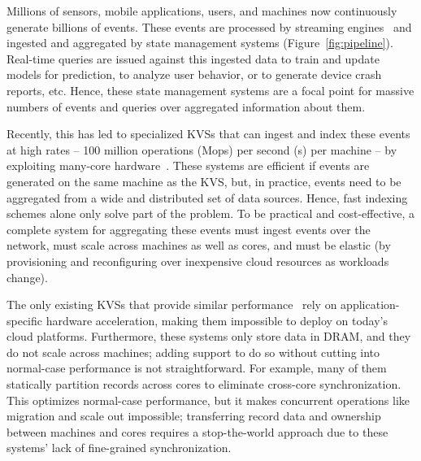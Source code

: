 

Millions of sensors, mobile applications, users, and machines now
continuously generate billions of events.
%
These events are processed by streaming
engines~\cite{spark-streaming,trill} and ingested and aggregated
by state management systems (Figure~\ref{fig:pipeline}).
%
Real-time queries are issued against this ingested data to train and
update models for prediction, to analyze user behavior, or to generate
device crash reports, etc.
%
Hence, these state management systems are a focal point for massive numbers of
events and queries over aggregated information about them.

Recently, this has led to specialized KVSs that can
ingest and index these events at high rates -- 100 million operations (Mops) per second (s) per machine -- by
exploiting many-core hardware~\cite{faster,anna}.
%
These systems are efficient if events are generated on the same machine as
the KVS, but, in practice, events need to be aggregated from a wide
and distributed set of data sources.
%
Hence, fast indexing schemes alone only solve part of the problem.
%
To be practical and cost-effective, a complete system for aggregating these
events must ingest events over the network, must scale across machines as
well as cores, and must be elastic (by provisioning and reconfiguring over
inexpensive cloud resources as workloads change).

The only existing KVSs that provide similar
performance~\cite{mica,flexnic,floem,kvdirect} rely on application-specific
hardware acceleration, making them impossible to deploy on today's cloud
platforms.
%
Furthermore, these systems only store data in DRAM, and they do not scale across
machines; adding support to do so without cutting into normal-case performance
is not straightforward.
%
For example, many of them statically partition records across cores to
eliminate cross-core synchronization.
%
This optimizes normal-case performance, but it makes concurrent
operations like migration and scale out impossible; transferring record data
and ownership between machines and cores requires a stop-the-world approach
due to these systems' lack of fine-grained synchronization.

